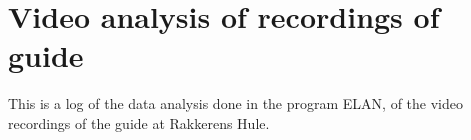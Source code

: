 \chapter{Video analysis of recordings of guide}\label{app:guide_results}
This is a log of the data analysis done in the program ELAN, of the video recordings of the guide at Rakkerens Hule.

